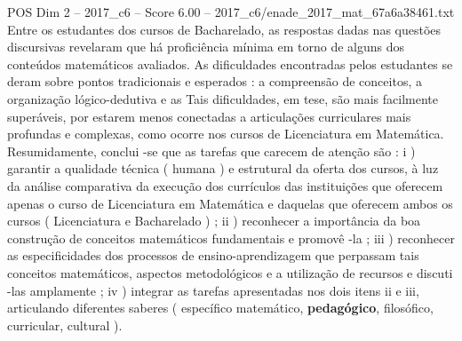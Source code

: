 \begin{textsample}{POS Dim 2 – 2017\_c6 – Score 6.00 – 2017\_c6/enade\_2017\_mat\_67a6a38461.txt}
Entre os estudantes dos cursos de Bacharelado, as respostas dadas nas questões discursivas revelaram que há proficiência mínima em torno de alguns dos conteúdos matemáticos avaliados.
As dificuldades encontradas pelos estudantes se deram sobre pontos tradicionais e esperados : a compreensão de conceitos, a organização lógico-dedutiva e as Tais dificuldades, em tese, são mais facilmente superáveis, por estarem menos conectadas a articulações curriculares mais profundas e complexas, como ocorre nos cursos de Licenciatura em Matemática.
Resumidamente, conclui -se que as tarefas que carecem de atenção são : i ) garantir a qualidade técnica ( humana ) e estrutural da oferta dos cursos, à luz da análise comparativa da execução dos currículos das instituições que oferecem apenas o curso de Licenciatura em Matemática e daquelas que oferecem ambos os cursos ( Licenciatura e Bacharelado ) ; ii ) reconhecer a importância da boa construção de conceitos matemáticos fundamentais e promovê -la ; iii ) reconhecer as especificidades dos processos de ensino-aprendizagem que perpassam tais conceitos matemáticos, aspectos metodológicos e a utilização de recursos e discuti -las amplamente ; iv ) integrar as tarefas apresentadas nos dois itens ii e iii, articulando diferentes saberes ( específico matemático, \textbf{pedagógico}, filosófico, curricular, cultural ).

\end{textsample}
